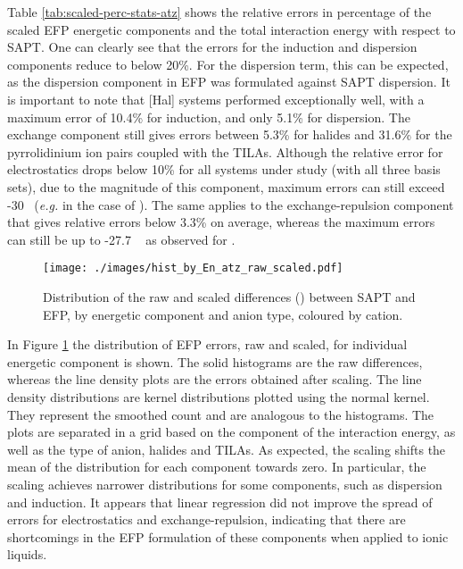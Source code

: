 Table \ref{tab:scaled-perc-stats-atz} shows the relative errors in percentage of the scaled EFP energetic components and the total interaction energy with respect to SAPT.
One can clearly see that the errors for the induction and dispersion components reduce to below 20\%.
For the dispersion term, this can be expected, as the dispersion component in EFP was formulated against SAPT dispersion.
\cite{Adamovic2005a}
It is important to note that [Hal] systems performed exceptionally well, with a maximum error of 10.4\% for induction, and only 5.1\% for dispersion.
The exchange component still gives errors between 5.3\% for  halides and 31.6\% for the pyrrolidinium ion pairs coupled with the TILAs.
Although the relative error for electrostatics drops below 10\% for all systems under study (with all three basis sets), due to the magnitude of this component, maximum errors can still exceed -30 \enUnit~(\emph{e.g.} in the case of ).
The same applies to the exchange-repulsion component that gives relative errors below 3.3\% on average, whereas the maximum errors can still be up to -27.7 \enUnit~ as observed for .


\begin{figure}[h]
    \caption{Distribution of the raw and scaled differences (\enUnit) between SAPT and EFP, by energetic component and anion type, coloured by cation.}
    \label{fig:hist-raw-scaled-atz}
    \centering
    \texttt{[image: ./images/hist\_by\_En\_atz\_raw\_scaled.pdf]}
\end{figure}


In Figure \ref{fig:hist-raw-scaled-atz} the distribution of EFP errors, raw and scaled, for individual energetic component is shown.
The solid histograms are the raw differences, whereas the line density plots are the errors obtained after scaling.
The line density distributions are kernel distributions plotted using the normal kernel.
They represent the smoothed count and are analogous to the histograms.
The plots are separated in a grid based on the component of the interaction energy, as well as the type of anion, halides and TILAs.
As expected, the scaling shifts the mean of the distribution for each component towards zero.
In particular, the scaling achieves narrower distributions for some components, such as dispersion and induction.
It appears that linear regression did not improve the spread of errors for electrostatics and exchange-repulsion, indicating that there are shortcomings in the EFP formulation of these components when applied to ionic liquids.



